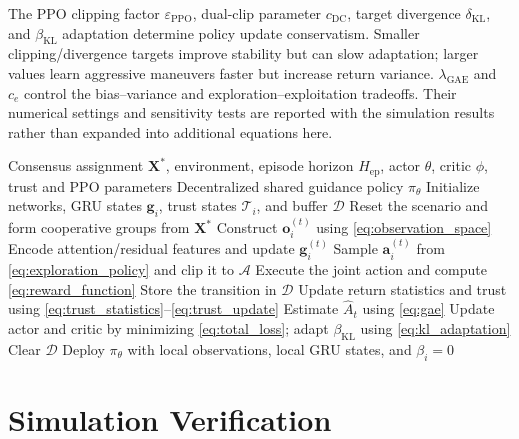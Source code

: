 \documentclass[lettersize,journal]{IEEEtran}
\begin{document}
The PPO clipping factor $\varepsilon_{\mathrm{PPO}}$, dual-clip parameter $c_{\mathrm{DC}}$,
target divergence $\delta_{\mathrm{KL}}$, and $\beta_{\mathrm{KL}}$ adaptation determine policy
update conservatism. Smaller clipping/divergence targets improve stability but can slow
adaptation; larger values learn aggressive maneuvers faster but increase return variance.
$\lambda_{\mathrm{GAE}}$ and $c_e$ control the bias--variance and exploration--exploitation
tradeoffs. Their numerical settings and sensitivity tests are reported with the simulation
results rather than expanded into additional equations here.

\begin{algorithm}[!t]
\caption{ART-MAPPO Cooperative Interception Guidance}
\label{alg:artmappo}
\footnotesize
\begin{algorithmic}[1]
\REQUIRE Consensus assignment $\mathbf X^{*}$, environment, episode horizon
$H_{\mathrm{ep}}$, actor $\theta$, critic $\phi$, trust and PPO parameters
\ENSURE Decentralized shared guidance policy $\pi_{\theta}$
\STATE Initialize networks, GRU states $\mathbf g_i$, trust states $\mathcal T_i$, and buffer
$\mathcal D$
    \STATE Reset the scenario and form cooperative groups from $\mathbf X^{*}$
            \STATE Construct $\mathbf o_i^{(t)}$ using \eqref{eq:observation_space}
            \STATE Encode attention/residual features and update $\mathbf g_i^{(t)}$
            \STATE Sample $\mathbf a_i^{(t)}$ from \eqref{eq:exploration_policy} and clip it
            to $\mathcal A$
        \ENDFOR
        \STATE Execute the joint action and compute \eqref{eq:reward_function}
        \STATE Store the transition in $\mathcal D$
    \ENDFOR
    \STATE Update return statistics and trust using
    \eqref{eq:trust_statistics}--\eqref{eq:trust_update}
    \STATE Estimate $\widehat A_t$ using \eqref{eq:gae}
    \STATE Update actor and critic by minimizing \eqref{eq:total_loss}; adapt
    $\beta_{\mathrm{KL}}$ using \eqref{eq:kl_adaptation}
    \STATE Clear $\mathcal D$
\ENDFOR
\STATE Deploy $\pi_{\theta}$ with local observations, local GRU states, and $\beta_i=0$
\end{algorithmic}
\end{algorithm}
 
\section{Simulation Verification}
\label{sec:simulation}
\end{document}
